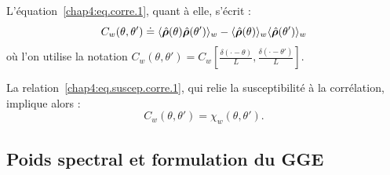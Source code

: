 \medskip


L’équation~\eqref{chap4:eq.corre.1}, quant à elle, s’écrit :
\begin{equation}\label{chap4:eq.corre.2}
C_w(\theta, \theta') \doteq \langle \hat{\bm{\rho}}(\theta) \hat{\bm{\rho}}(\theta') \rangle_w - \langle \hat{\bm{\rho}}(\theta) \rangle_w \langle \hat{\bm{\rho}}(\theta') \rangle_w
\end{equation}
où l’on utilise la notation $C_w(\theta, \theta') = C_w\left[ \frac{\delta(\cdot - \theta)}{L}, \frac{\delta(\cdot - \theta')}{L} \right]$.

\medskip


La relation~\eqref{chap4:eq.suscep.corre.1}, qui relie la susceptibilité à la corrélation, implique alors :
\begin{equation}\label{chap4:eq.suscep.corre.1111}
	C_w(\theta, \theta') = \chi_w(\theta, \theta').
\end{equation}


\subsection{Poids spectral et formulation du GGE}


